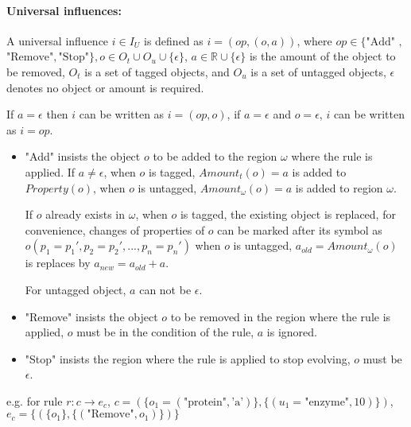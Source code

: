 \documentclass[9pt,a4paper,twoside]{article}
\begin{document}
\paragraph{Universal influences:}
          
                A universal influence $i \in I_U$ is defined as $i = (op, (o,a))$, where $op \in \{\text{"Add"}$ $,$ $ \text{"Remove"}, \text{"Stop"}\}$$,$$ o \in O_t \cup O_u \cup \{\epsilon\}$,
                $a \in \mathbb{R} \cup \{\epsilon\}$ is the amount of the object to be removed, $O_t$ is a set of tagged objects, and $O_u$ is a set of untagged objects, 
                $\epsilon$ denotes no object or amount is required. 
                
                If $a = \epsilon$ then $i$ can be written as $i = (op, o)$, if $a = \epsilon$ and $o =\epsilon$,  $i$
                can be written as $i=op$. 
\begin{itemize}
                \item "Add" insists the object $o$ to be added to the region $\omega$ where the rule is applied. 
                    If $a \neq \epsilon$, 
                        when $o$ is tagged, $Amount_t(o) = a$ is added to $Property(o)$, 
                        when $o$ is untagged, $Amount_\omega(o) = a$ is added to region $\omega$. 
                  
                    If $o$ already exists in $\omega$,
                        when $o$ is tagged, the existing object is replaced, for convenience, changes of properties of $o$ can be marked after
                        its symbol as $o(p_1 = p_1', p_2 = p_2',..., p_n = p_n')$
                        when $o$ is untagged, $a_{old} = Amount_\omega(o)$ is replaces by $a_{new} = a_{old} + a$.
                              
                    For untagged object, $a$ can not be $\epsilon$. 

                \item "Remove" insists the object $o$ to be removed in the region where the rule is applied, $o$ must be in the condition of the rule, $a$ is ignored.
                
                \item "Stop" insists the region where the rule is applied to stop evolving, $o$ must be $\epsilon$.
\end{itemize}

            e.g. for rule $r: c \rightarrow e_c$, $c = (\{ o_1=(\text{"protein"}, \text{'a'}) \}, \{(u_1=\text{"enzyme"}, 10)\})$, 
            $e_c = \{ (\{o_1\}, \{(\text{"Remove"}, o_1)\})\} $
\end{document}
